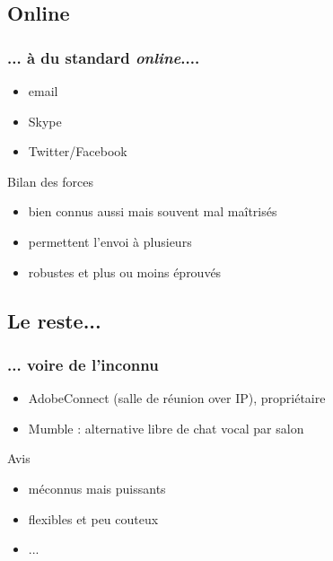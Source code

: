 \documentclass{beamer}
\begin{document}
\subsection{Online} %

\begin{frame}
    \frametitle{... à du standard \textit{online}....} 

    \begin{itemize}
        \item email
        \item Skype
        \item Twitter/Facebook
    \end{itemize}

    \pause{}

    \begin{block}{Bilan des forces}
        \begin{itemize}
            \item bien connus aussi mais souvent mal maîtrisés
            \item permettent l'envoi à plusieurs
            \item robustes et plus ou moins éprouvés
        \end{itemize}
    \end{block}
\end{frame}

\subsection{Le reste...} %

\begin{frame}
    \frametitle{... voire de l'inconnu}

    \begin{itemize}
        \item AdobeConnect (salle de réunion over IP), propriétaire
        \item Mumble : alternative libre de chat vocal par salon
    \end{itemize}

    \pause{}

    \begin{block}{Avis}
        \begin{itemize}
            \item méconnus mais puissants
            \item flexibles et peu couteux
            \item ...
        \end{itemize}

    \end{block}
\end{frame}
\end{document}
